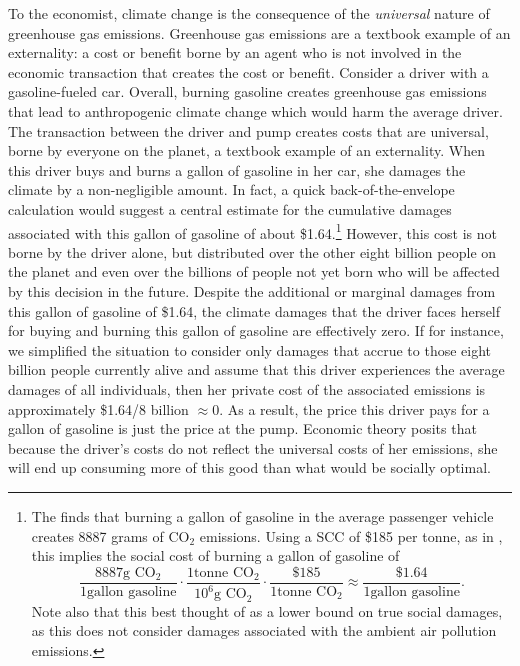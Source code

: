 To the economist, climate change is the consequence of the \emph{universal} nature of greenhouse gas emissions. Greenhouse gas emissions  are a textbook example of an externality: a cost or benefit borne by an agent who is not involved in the economic transaction that creates the cost or benefit. Consider a driver with a gasoline-fueled car. Overall, burning gasoline creates greenhouse gas emissions that lead to anthropogenic climate change which would harm the average driver. The transaction between the driver and pump creates costs that are universal, borne by everyone on the planet, a textbook example of an externality. When this driver buys and burns a gallon of gasoline in her car, she damages the climate by a non-negligible amount. In fact, a quick back-of-the-envelope calculation would suggest a central estimate for the cumulative damages associated with this gallon of gasoline of about \$1.64.\footnote{The \cite{epa2022greenhouse} finds that burning a gallon of gasoline in the average passenger vehicle creates 8887 grams of CO$_2$ emissions. Using a SCC of \$185 per tonne, as in \cite{rennert2022comprehensive}, this implies the social cost of burning a gallon of gasoline of 
$$\frac{8887 \text{g CO$_2$}}{1 \text{gallon gasoline}} \cdot \frac{1 \text{tonne CO$_2$}}{10^6 \text{g CO$_2$}} \cdot \frac{\$185}{1 \text{tonne CO$_2$}} \approx \frac{\$1.64}{1 \text{gallon gasoline}}.$$
Note also that this best thought of as a lower bound on true social damages, as this does not consider damages associated with the ambient air pollution emissions.} However, this cost is not borne by the driver alone, but distributed over the other eight billion people on the planet and even over the billions of people not yet born who will be affected by this decision in the future. Despite the additional or marginal damages from this gallon of gasoline of \$1.64, the climate damages that the driver faces herself for buying and burning this gallon of gasoline are effectively zero. If for instance, we simplified the situation to consider only damages that accrue to those eight billion people currently alive and assume that this driver experiences the average damages of all individuals, then her private cost of the associated emissions is approximately \$1.64/8 billion $\approx 0$. As a result, the price this driver pays for a gallon of gasoline is just the price at the pump. Economic theory posits that because the driver's costs do not reflect the universal costs of her emissions, she will end up consuming more of this good than what would be socially optimal.


